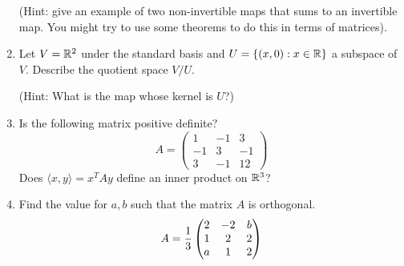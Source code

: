 \documentclass{amsart}
\begin{document}
\begin{enumerate}
(Hint: give an example of two non-invertible maps that sums to an invertible map. You might try to use some theorems to do this in terms of matrices).

\item Let $V=\mathbb{R}^2$ under the standard basis and $U=\{(x,0):x\in\mathbb{R}\}$ a subspace of $V$. Describe the quotient space $V/U$. 

(Hint: What is the map whose kernel is $U$?)
%
%
\item Is the following matrix positive definite?
\[A=\begin{pmatrix}
	1&-1&3\\-1&3&-1\\3&-1&12
\end{pmatrix}\]
Does $\langle x,y\rangle =x^TAy$ define an inner product on $\mathbb{R}^3$?
\item Find the value for $a,b$ such that the matrix $A$ is orthogonal.
\[A={1\over 3}\begin{pmatrix}2&-2&b\\1&2&2\\a&1&2
\end{pmatrix}\]
\end{enumerate}


%
%
\end{document}
